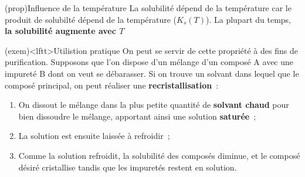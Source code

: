 \documentclass[../../main/main.tex]{subfiles}
\begin{document}
\begin{tcb*}(prop){Influence de la température}
  La solubilité dépend de la température car le produit de solubilté dépend de
  la température ($K_s(T)$). La plupart du temps, \textbf{la solubilité
  augmente avec $T$}
\end{tcb*}
\begin{tcb*}(exem)<lftt>{Utilistion pratique}
  On peut se servir de cette propriété à des fins de purification.
  Supposons que l'on dispose
d'un mélange d'un composé A avec une impureté B dont on veut se débarasser. Si
on trouve un solvant dans lequel  que le composé
principal, on peut réaliser une \textbf{recristallisation}~:
  \begin{enumerate}
    \item On dissout le mélange
   dans la plus petite quantité de \textbf{solvant chaud} pour bien dissoudre
  le mélange, apportant ainsi une solution \textbf{saturée}~;
    \item La solution est ensuite laissée à refroidir~;
    \item Comme la solution refroidit, la solubilité des composés
  diminue, et le composé désiré cristallise tandis que les impuretés restent en
  solution.
  \end{enumerate}
\end{tcb*}
\end{document}
